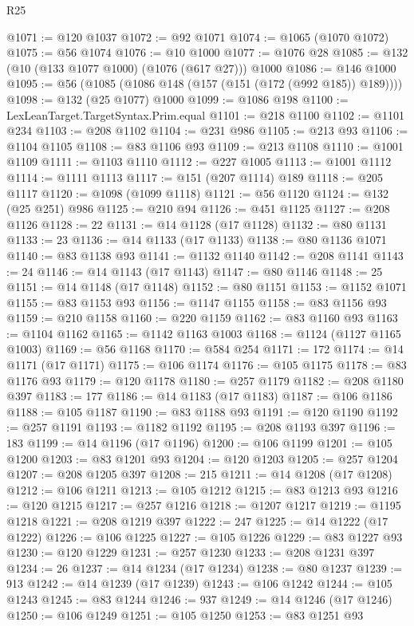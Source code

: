 \begin{lexlean}{R25}
\begin{coremodule}
@1071 := @120 @1037
@1072 := @92 @1071
@1074 := @1065 (@1070 @1072)
@1075 := @56 @1074
@1076 := @10 @1000
@1077 := @1076 @28
@1085 := @132 (@10 (@133 @1077 @1000) (@1076 (@617 @27))) @1000
@1086 := @146 @1000
@1095 := @56 (@1085 (@1086 @148 (@157 (@151 (@172 (@992 @185)) @189))))
@1098 := @132 (@25 @1077) @1000
@1099 := @1086 @198
@1100 := LexLeanTarget.TargetSyntax.Prim.equal
@1101 := @218 @1100
@1102 := @1101 @234
@1103 := @208 @1102
@1104 := @231 @986
@1105 := @213 @93
@1106 := @1104 @1105
@1108 := @83 @1106 @93
@1109 := @213 @1108
@1110 := @1001 @1109
@1111 := @1103 @1110
@1112 := @227 @1005
@1113 := @1001 @1112
@1114 := @1111 @1113
@1117 := @151 (@207 @1114) @189
@1118 := @205 @1117
@1120 := @1098 (@1099 @1118)
@1121 := @56 @1120
@1124 := @132 (@25 @251) @986
@1125 := @210 @94
@1126 := @451 @1125
@1127 := @208 @1126
@1128 := 22
@1131 := @14 @1128 (@17 @1128)
@1132 := @80 @1131
@1133 := 23
@1136 := @14 @1133 (@17 @1133)
@1138 := @80 @1136 @1071
@1140 := @83 @1138 @93
@1141 := @1132 @1140
@1142 := @208 @1141
@1143 := 24
@1146 := @14 @1143 (@17 @1143)
@1147 := @80 @1146
@1148 := 25
@1151 := @14 @1148 (@17 @1148)
@1152 := @80 @1151
@1153 := @1152 @1071
@1155 := @83 @1153 @93
@1156 := @1147 @1155
@1158 := @83 @1156 @93
@1159 := @210 @1158
@1160 := @220 @1159
@1162 := @83 @1160 @93
@1163 := @1104 @1162
@1165 := @1142 @1163 @1003
@1168 := @1124 (@1127 @1165 @1003)
@1169 := @56 @1168
@1170 := @584 @254
@1171 := 172
@1174 := @14 @1171 (@17 @1171)
@1175 := @106 @1174
@1176 := @105 @1175
@1178 := @83 @1176 @93
@1179 := @120 @1178
@1180 := @257 @1179
@1182 := @208 @1180 @397
@1183 := 177
@1186 := @14 @1183 (@17 @1183)
@1187 := @106 @1186
@1188 := @105 @1187
@1190 := @83 @1188 @93
@1191 := @120 @1190
@1192 := @257 @1191
@1193 := @1182 @1192
@1195 := @208 @1193 @397
@1196 := 183
@1199 := @14 @1196 (@17 @1196)
@1200 := @106 @1199
@1201 := @105 @1200
@1203 := @83 @1201 @93
@1204 := @120 @1203
@1205 := @257 @1204
@1207 := @208 @1205 @397
@1208 := 215
@1211 := @14 @1208 (@17 @1208)
@1212 := @106 @1211
@1213 := @105 @1212
@1215 := @83 @1213 @93
@1216 := @120 @1215
@1217 := @257 @1216
@1218 := @1207 @1217
@1219 := @1195 @1218
@1221 := @208 @1219 @397
@1222 := 247
@1225 := @14 @1222 (@17 @1222)
@1226 := @106 @1225
@1227 := @105 @1226
@1229 := @83 @1227 @93
@1230 := @120 @1229
@1231 := @257 @1230
@1233 := @208 @1231 @397
@1234 := 26
@1237 := @14 @1234 (@17 @1234)
@1238 := @80 @1237
@1239 := 913
@1242 := @14 @1239 (@17 @1239)
@1243 := @106 @1242
@1244 := @105 @1243
@1245 := @83 @1244
@1246 := 937
@1249 := @14 @1246 (@17 @1246)
@1250 := @106 @1249
@1251 := @105 @1250
@1253 := @83 @1251 @93

\end{coremodule}
\end{lexlean}
